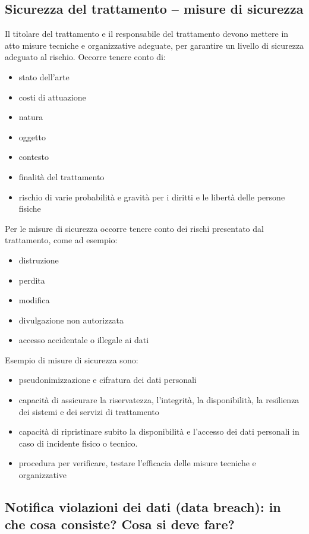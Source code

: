 \subsection{Sicurezza del trattamento – misure di sicurezza}

Il titolare del trattamento e il responsabile del trattamento devono mettere in atto misure tecniche e organizzative adeguate, per garantire un livello di sicurezza adeguato al rischio.
Occorre tenere conto di:
\begin{itemize}
    \item stato dell'arte
    \item costi di attuazione
    \item natura
    \item oggetto
    \item contesto
    \item finalità del trattamento
    \item rischio di varie probabilità e gravità per i diritti e le libertà delle persone fisiche
\end{itemize}
Per le misure di sicurezza occorre tenere conto dei rischi presentato dal trattamento, come ad esempio:
\begin{itemize}
    \item distruzione
    \item perdita
    \item modifica
    \item divulgazione non autorizzata
    \item accesso accidentale o illegale ai dati
\end{itemize}
Esempio di misure di sicurezza sono:
\begin{itemize}
    \item pseudonimizzazione e cifratura dei dati personali
    \item capacità di assicurare la riservatezza, l'integrità, la disponibilità, la resilienza dei sistemi e dei servizi di trattamento
    \item capacità di ripristinare subito la disponibilità e l'accesso dei dati personali in caso di incidente fisico o tecnico.
    \item procedura per verificare, testare l'efficacia delle misure tecniche e organizzative
\end{itemize}

\subsection{Notifica violazioni dei dati (data breach): in che cosa consiste? Cosa si deve fare?}

